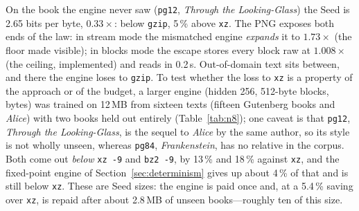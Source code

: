 \documentclass[11pt,a4paper]{article}
\theoremstyle{definition}
\theoremstyle{plain}
\theoremstyle{remark}
\begin{document}
\begin{table}[!htb]
\centering\small
\caption{Real files as single objects with the 55\,KB English engine (shared, counted once).
Write = closed-form Seed Discovery, read = Manifestation; every regenerated file matched its
sha-256. \texttt{pg12.txt} here is the raw Project Gutenberg file including its header and
licence (196,534\,B); Tables~\ref{tab:multi}--\ref{tab:n8} use the book's body alone
(176,754\,B).}
\label{tab:realfile}
{\footnotesize\setlength{\tabcolsep}{3pt}\realfileTable{}}
\end{table}

On the book the engine never saw (\texttt{pg12}, \emph{Through the Looking-Glass}) the Seed is
2.65 bits per byte, $0.33\times$: below \texttt{gzip}, 5\,\% above \texttt{xz}. The PNG exposes
both ends of the law: in stream mode the mismatched engine \emph{expands} it to $1.73\times$
(the floor made visible); in blocks mode the escape stores every block raw at $1.008\times$ (the
ceiling, implemented) and reads in 0.2\,s. Out-of-domain text sits between, and there the engine
loses to \texttt{gzip}. To test whether the loss to \texttt{xz} is a property of the approach or
of the budget, a larger engine (hidden 256, 512-byte blocks, \nEightBytes{} bytes) was trained on
12\,MB from sixteen texts (fifteen Gutenberg books and \emph{Alice}) with two books held out
entirely (Table~\ref{tab:n8}); one caveat is that \texttt{pg12}, \emph{Through the
Looking-Glass}, is the sequel to \emph{Alice} by the same author, so its style is not wholly
unseen, whereas \texttt{pg84}, \emph{Frankenstein}, has no relative in the corpus. Both come out
\emph{below} \texttt{xz -9} and \texttt{bz2 -9}, by 13\,\% and 18\,\% against \texttt{xz}, and the
fixed-point engine of Section~\ref{sec:determinism} gives up about 4\,\% of that and is still
below \texttt{xz}. These are Seed sizes: the engine is paid once and, at a 5.4\,\% saving over
\texttt{xz}, is repaid after about 2.8\,MB of unseen books---roughly ten of this size.

\begin{table}[!htb]
\centering\small
\caption{The larger English engine on two books it never saw. ``float'' is stream mode;
``fixed/C'' the integer engine in compiled blocks mode. All bit-exact.}
\label{tab:n8}
{\footnotesize\setlength{\tabcolsep}{3pt}\nEightTable{}}
\end{table}
\end{document}
